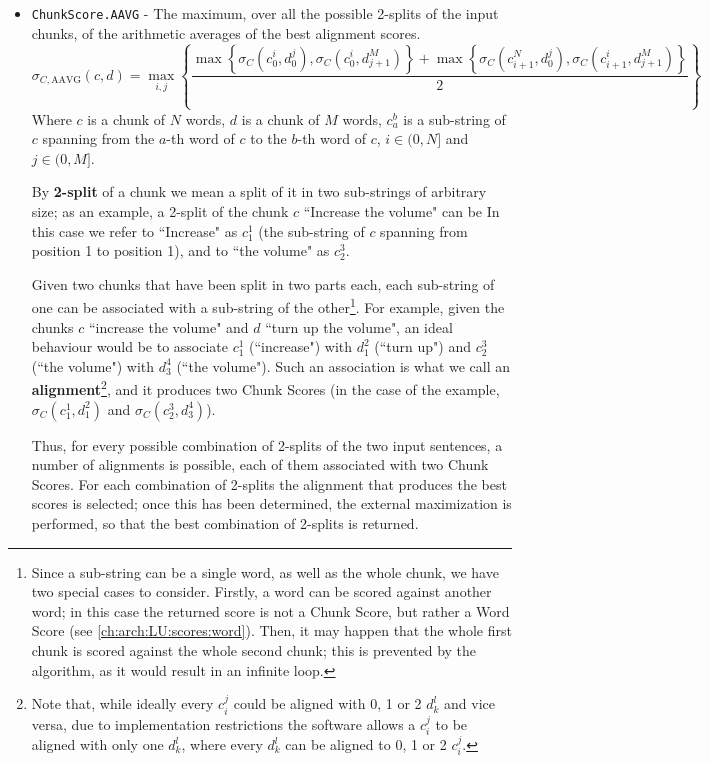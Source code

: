 \begin{itemize}
	\item \texttt{ChunkScore.AAVG} - The maximum, over all the possible 2-splits of the input chunks, of the arithmetic averages of the best alignment scores.
	\begin{displaymath}
		\sigma_{C,\text{AAVG}}(c,d) = \max\limits_{i,j}\left\{\frac{ \max\left\{\sigma_C(c_0^i,d_0^j), \sigma_C(c_0^i,d_{j+1}^M)\right\} + \max\left\{\sigma_C(c_{i+1}^N,d_0^j),\sigma_C(c_{i+1}^i,d_{j+1}^M)\right\}}{2}\right\}
	\end{displaymath}
	Where $c$ is a chunk of $N$ words, $d$ is a chunk of $M$ words, $c_a^b$ is a sub-string of $c$ spanning from the $a$-th word of $c$ to the $b$-th word of $c$, $i\in(0,N]$ and $j\in(0,M]$.
	
	By \textbf{2-split} of a chunk we mean a split of it in two sub-strings of arbitrary size; as an example, a 2-split of the chunk $c$ ``Increase the volume" can be  In this case we refer to ``Increase" as $c_1^1$ (the sub-string of $c$ spanning from position 1 to position 1), and to ``the volume" as $c_2^3$.
	
	Given two chunks that have been split in two parts each, each sub-string of one can be associated with a sub-string of the other\footnote{Since a sub-string can be a single word, as well as the whole chunk, we have two special cases to consider. Firstly, a word can be scored against another word; in this case the returned score is not a Chunk Score, but rather a Word Score (see \ref{ch:arch:LU:scores:word}). Then, it may happen that the whole first chunk is scored against the whole second chunk; this is prevented by the algorithm, as it would result in an infinite loop.}. For example, given the chunks $c$ ``increase the volume" and $d$ ``turn up the volume", an ideal behaviour would be to associate $c_1^1$ (``increase") with $d_1^2$ (``turn up") and $c_2^3$ (``the volume") with $d_3^4$ (``the volume"). Such an association is what we call an \textbf{alignment}\footnote{Note that, while ideally every $c_i^j$ could be aligned with 0, 1 or 2 $d_k^l$ and vice versa, due to implementation restrictions the software allows a $c_i^j$ to be aligned with only one $d_k^l$, where every $d_k^l$ can be aligned to 0, 1 or 2 $c_i^j$. }, and it produces two Chunk Scores (in the case of the example, $\sigma_C(c_1^1,d_1^2)$ and $\sigma_C(c_2^3,d_3^4)$).
	
	Thus, for every possible combination of 2-splits of the two input sentences, a number of alignments is possible, each of them associated with two Chunk Scores. For each combination of 2-splits the alignment that produces the best scores is selected; once this has been determined, the external maximization is performed, so that the best combination of 2-splits is returned.
	

\end{itemize}
